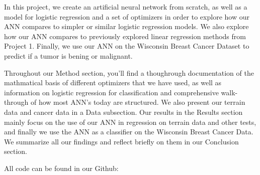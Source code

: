 In this project, we create an artificial neural network from scratch, as well as a model for logistic regression and a set of optimizers 
in order to explore how our ANN compares to simpler or similar logistic regression models. We also explore how our ANN compares to previously 
explored linear regression methods from Project 1. Finally, we use our ANN on the Wisconsin Breast Cancer Dataset to predict if a
tumor is bening or malignant. 

Throughout our Method section, you'll find a thoughrough documentation of the mathmatical basis of different optimizers
that we have used, as well as information on logistic regression for classification and comprehensive walk-through of how most ANN's today are structured.
We also present our terrain data and cancer data in a Data subsection. Our results in the Results section mainly focus on the use of our ANN 
in regression on terrain data and other tests, and finally we use the ANN as a classifier on the Wisconsin Breast Cancer Data. We summarize all our 
findings and reflect briefly on them in our Conclusion section. 

All code can be found in our Github: 




